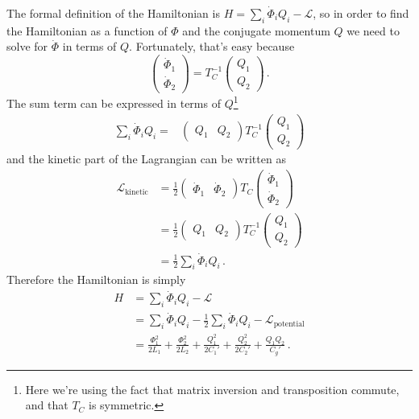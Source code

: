 The formal definition of the Hamiltonian is $H = \sum_i \dot \Phi_i Q_i - \mathcal{L}$, so in order to find the Hamiltonian as a function of $\Phi$ and the conjugate momentum $Q$ we need to solve for $\dot \Phi$ in terms of $Q$.
Fortunately, that's easy because
\begin{equation*}
  \left( \begin{array}{c} \dot \Phi_1 \\ \dot \Phi_2 \end{array} \right)
  =
  T_C^{-1}
  \left( \begin{array}{c} Q_1 \\ Q_2 \end{array} \right) \, .
\end{equation*}
The sum term can be expressed in terms of $Q$\footnote{Here we're using the fact that matrix inversion and transposition commute, and that $T_C$ is symmetric.}
\begin{align*}
  \sum_i \dot \Phi_i Q_i
  =& \left( \begin{array}{cc} Q_1 & Q_2 \end{array} \right)
  T_C^{-1}
  \left( \begin{array}{c} Q_1 \\ Q_2 \end{array} \right)
\end{align*}
and the kinetic part of the Lagrangian can be written as
\begin{align*}
  \mathcal{L}_\text{kinetic}
  &= \frac{1}{2}
    \left( \begin{array}{cc} \dot{\Phi}_1 & \dot{\Phi}_2 \end{array} \right)
    T_C
    \left( \begin{array}{c} \dot{\Phi}_1 \\ \dot{\Phi}_2 \end{array} \right) \\
  &= \frac{1}{2} 
    \left( \begin{array}{cc} Q_1 & Q_2 \end{array} \right)
    T_C^{-1}
    \left( \begin{array}{c} Q_1 \\ Q_2 \end{array} \right) \\
  &= \frac{1}{2} \sum_i \dot \Phi_i Q_i
    \, .
\end{align*}
Therefore the Hamiltonian is simply
\begin{align*}
  H
  &= \sum_i \dot \Phi_i Q_i - \mathcal{L} \\
  &= \sum_i \dot \Phi_i Q_i - \frac{1}{2} \sum_i \dot \Phi_i Q_i - \mathcal{L}_\text{potential} \\
  &=
    \frac{\Phi_1^2}{2 L_1}
  + \frac{\Phi_2^2}{2 L_2}
  + \frac{Q_1^2}{2 C_1'}
  + \frac{Q_2^2}{2 C_2'}
  + \frac{Q_1 Q_2}{C_g'} \, .
\end{align*}

